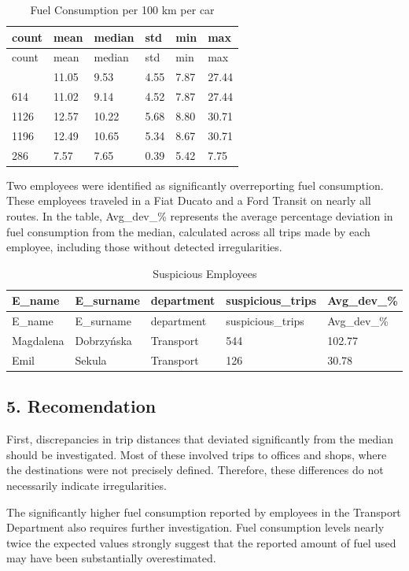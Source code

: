 \documentclass[
  letterpaper,
  DIV=11,
  numbers=noendperiod]{scrartcl}
\begin{document}
\begin{longtable}[]{@{}llllll@{}}
\caption{Fuel Consumption per 100 km per
car}\label{T_d6f3b}\tabularnewline
\toprule\noalign{}
count & mean & median & std & min & max \\
\midrule\noalign{}
\endfirsthead
\toprule\noalign{}
count & mean & median & std & min & max \\
\midrule\noalign{}
\endhead
\bottomrule\noalign{}
\endlastfoot
1210 & 11.05 & 9.53 & 4.55 & 7.87 & 27.44 \\
614 & 11.02 & 9.14 & 4.52 & 7.87 & 27.44 \\
1126 & 12.57 & 10.22 & 5.68 & 8.80 & 30.71 \\
1196 & 12.49 & 10.65 & 5.34 & 8.67 & 30.71 \\
286 & 7.57 & 7.65 & 0.39 & 5.42 & 7.75 \\
\end{longtable}

Two employees were identified as significantly overreporting fuel
consumption. These employees traveled in a Fiat Ducato and a Ford
Transit on nearly all routes. In the table, Avg\_dev\_\% represents the
average percentage deviation in fuel consumption from the median,
calculated across all trips made by each employee, including those
without detected irregularities.

\begin{longtable}[]{@{}lllll@{}}
\caption{Suspicious Employees}\label{T_0fae9}\tabularnewline
\toprule\noalign{}
E\_name & E\_surname & department & suspicious\_trips & Avg\_dev\_\% \\
\midrule\noalign{}
\endfirsthead
\toprule\noalign{}
E\_name & E\_surname & department & suspicious\_trips & Avg\_dev\_\% \\
\midrule\noalign{}
\endhead
\bottomrule\noalign{}
\endlastfoot
Magdalena & Dobrzyńska & Transport & 544 & 102.77 \\
Emil & Sekula & Transport & 126 & 30.78 \\
\end{longtable}

\subsection{5. Recomendation}\label{recomendation}

First, discrepancies in trip distances that deviated significantly from
the median should be investigated. Most of these involved trips to
offices and shops, where the destinations were not precisely defined.
Therefore, these differences do not necessarily indicate irregularities.

The significantly higher fuel consumption reported by employees in the
Transport Department also requires further investigation. Fuel
consumption levels nearly twice the expected values strongly suggest
that the reported amount of fuel used may have been substantially
overestimated.
\end{document}
